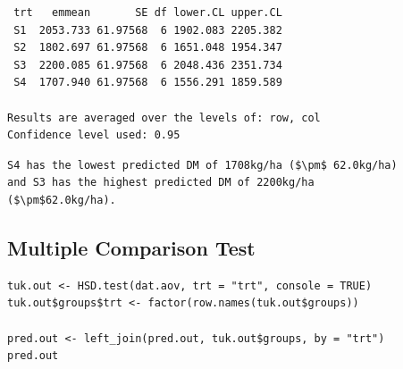 \documentclass[a4paper, 10pt, fleqn, twosided]{memoir}
\begin{document}
\begin{tcolorbox}[title = Example 4 Predicted output]
\begin{verbatim}
 trt   emmean       SE df lower.CL upper.CL
 S1  2053.733 61.97568  6 1902.083 2205.382
 S2  1802.697 61.97568  6 1651.048 1954.347
 S3  2200.085 61.97568  6 2048.436 2351.734
 S4  1707.940 61.97568  6 1556.291 1859.589

Results are averaged over the levels of: row, col
Confidence level used: 0.95
\end{verbatim}
\end{tcolorbox}

\begin{tcolorbox}[title = Example 4 Prediction interpretation]
\begin{lstlisting}
S4 has the lowest predicted DM of 1708kg/ha ($\pm$ 62.0kg/ha)
and S3 has the highest predicted DM of 2200kg/ha
($\pm$62.0kg/ha).
\end{lstlisting}
\end{tcolorbox}


\subsection{Multiple Comparison Test}

\begin{tcolorbox}[title = Example 4 Tukey's multiple comparison]
\begin{verbatim}
tuk.out <- HSD.test(dat.aov, trt = "trt", console = TRUE)
tuk.out$groups$trt <- factor(row.names(tuk.out$groups))

pred.out <- left_join(pred.out, tuk.out$groups, by = "trt")
pred.out
\end{verbatim}
\end{tcolorbox}
\clearpage
\end{document}

